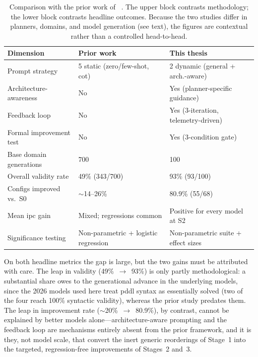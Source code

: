 \begin{table}[htbp]
  \centering
  \caption{Comparison with the prior work of \citeauthor{Elis2025}~\cite{Elis2025}. The upper block contrasts methodology; the lower block contrasts headline outcomes. Because the two studies differ in planners, domains, and model generation (see text), the figures are contextual rather than a controlled head-to-head.}
  \label{tab:elis_comparison}
  \small
  \begin{tabular}{l l l}
    \toprule
    \textbf{Dimension} & \textbf{Prior work~\cite{Elis2025}} & \textbf{This thesis} \\
    \midrule
    Prompt strategy            & 5 static (zero/few-shot, \gls{cot})  & 2 dynamic (general + arch.-aware) \\
    Architecture-awareness     & No                                   & Yes (planner-specific guidance) \\
    Feedback loop              & No                                   & Yes (3-iteration, telemetry-driven) \\
    Formal improvement test    & No                                   & Yes (3-condition gate) \\
    Base domain generations    & 700                                  & 100 \\
    \addlinespace
    Overall validity rate      & 49\% (343/700)                       & 93\% (93/100) \\
    Configs improved vs.\ S0   & $\sim$14--26\%                       & 80.9\% (55/68) \\
    Mean \gls{ipc} gain        & Mixed; regressions common            & Positive for every model at S2 \\
    Significance testing       & Non-parametric + logistic regression                        & Non-parametric suite + effect sizes \\
    \bottomrule
  \end{tabular}
\end{table}

On both headline metrics the gap is large, but the two gains must be attributed with care. The leap in validity (49\%~$\rightarrow$~93\%) is only partly methodological: a substantial share owes to the generational advance in the underlying models, since the 2026 models used here treat \gls{pddl} syntax as essentially solved (two of the four reach 100\% syntactic validity), whereas the prior study predates them. The leap in improvement rate ($\sim$20\%~$\rightarrow$~80.9\%), by contrast, cannot be explained by better models alone---architecture-aware prompting and the feedback loop are mechanisms entirely absent from the prior framework, and it is they, not model scale, that convert the inert generic reorderings of Stage~1 into the targeted, regression-free improvements of Stages~2 and~3.

